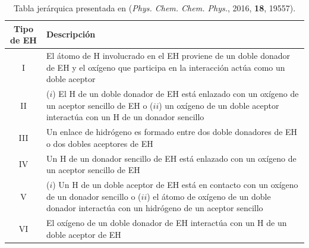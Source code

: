 \begin{table}[h]
  \begin{center}
  \caption{Tabla jerárquica presentada en
  (\textit{Phys. Chem. Chem. Phys.}, 2016, \textbf{18}, 19557).}
  \begin{tabular}{c||p{12.5cm}}
Tipo de EH  & Descripción \\ \hline\hline
I           & El átomo de H involucrado en el EH proviene de un doble donador de EH
              y el oxígeno que participa en la interacción actúa como un doble aceptor\\ \hline
II          & ($i$) El H de un doble donador de EH está enlazado con un oxígeno de un aceptor
              sencillo de EH o ($ii$) un oxígeno de un doble aceptor interactúa con un H
              de un donador sencillo \\ \hline
III         & Un enlace de hidrógeno es formado entre dos doble donadores
              de EH o dos dobles aceptores de EH \\ \hline
IV          & Un H de un donador sencillo de EH está enlazado con un oxígeno
              de un aceptor sencillo de EH \\ \hline
V           & ($i$) Un H de un doble aceptor de EH está en contacto con un oxígeno de un
              donador sencillo o ($ii$) el átomo de oxígeno de un doble donador interactúa
              con un hidrógeno de un aceptor sencillo \\ \hline
VI          & El oxígeno de un doble donador de EH interactúa con un H de 
              un doble aceptor de EH \\ 
  \end{tabular}
  \label{motivacion}
  \end{center}
\end{table}

\newpage
\thispagestyle{empty}
